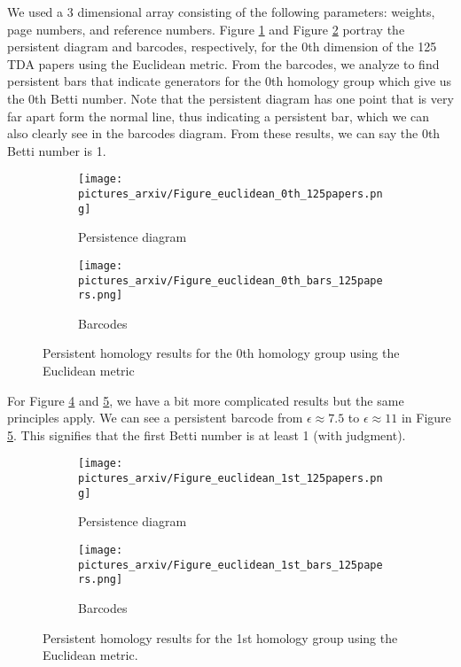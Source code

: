 \documentclass[12pt]{article}
\theoremstyle{definition}
\begin{document}
\newline 
\par We used a 3 dimensional array consisting of the following parameters: weights, page numbers, and reference numbers. Figure \ref{pic-125papers-0th-euclidean} and Figure \ref{pic-125papers-0th-euclidean-bars} portray the persistent diagram and barcodes, respectively, for the 0th dimension of the 125 TDA papers using the Euclidean metric. From the barcodes, we analyze to find persistent bars that indicate generators for the 0th homology group which give us the 0th Betti number. Note that the persistent diagram has one point that is very far apart form the normal line, thus indicating a persistent bar, which we can also clearly see in the barcodes diagram. From these results, we can say the 0th Betti number is 1. 

\begin{figure}[H]
\begin{subfigure}{.5\textwidth}
  \centering
  \texttt{[image: pictures\_arxiv/Figure\_euclidean\_0th\_125papers.png]} 
  \caption{Persistence diagram}
  \label{pic-125papers-0th-euclidean} 
\end{subfigure}%
\begin{subfigure}{.5\textwidth}
  \centering
  \texttt{[image: pictures\_arxiv/Figure\_euclidean\_0th\_bars\_125papers.png]} 
  \caption{Barcodes}
  \label{pic-125papers-0th-euclidean-bars}
\end{subfigure}
\caption{Persistent homology results for the 0th homology group using the Euclidean metric}
\label{fig-125papers-0th-euclidean}
\end{figure}

\par For Figure \ref{pic-125papers-1st-euclidean} and \ref{pic-125papers-1st-euclidean-bars}, we have a bit more complicated results but the same principles apply. We can see a persistent barcode from $\epsilon\approx 7.5$ to $\epsilon\approx 11$ in Figure \ref{pic-125papers-1st-euclidean-bars}. This signifies that the first Betti number is at least 1 (with judgment). 

\begin{figure}[H]
\begin{subfigure}{.5\textwidth}
  \centering
  \texttt{[image: pictures\_arxiv/Figure\_euclidean\_1st\_125papers.png]} 
  \caption{Persistence diagram}
  \label{pic-125papers-1st-euclidean} 
\end{subfigure}%
\begin{subfigure}{.5\textwidth}
  \centering
  \texttt{[image: pictures\_arxiv/Figure\_euclidean\_1st\_bars\_125papers.png]}
  \caption{Barcodes}
  \label{pic-125papers-1st-euclidean-bars}
\end{subfigure}
\caption{Persistent homology results for the 1st homology group using the Euclidean metric.}
\label{fig-125papers-1st-euclidean}
\end{figure}
\end{document}
